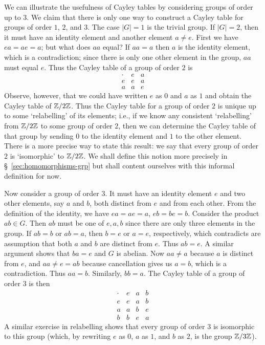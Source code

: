 \begin{example}
    We can illustrate the usefulness of Cayley tables by considering groups of
    order up to \(3\). We claim that there is only one way to construct a Cayley
    table for groups of order \(1\), \(2\), and \(3\). The case \(|G| = 1\) is
    the trivial group. If \(|G| = 2\), then it must have an identity element and
    another element \(a \neq e\). First we have \(ea = ae = a\); but what does
    \(aa\) equal? If \(aa = a\) then \(a\) is the identity element, which is a
    contradiction; since there is only one other element in the group, \(aa\)
    must equal \(e\). Thus the Cayley table of a group of order \(2\) is
    \[
        \begin{array}{c|cc}
            \cdot & e & a\\
            \hline
            e & e & a\\
            a & a & e
        \end{array}
    \]
    Observe, however, that we could have written \(e\) as \(0\) and \(a\) as
    \(1\) and obtain the Cayley table of \(\mathbb{Z}/2\mathbb{Z}\). Thus the Cayley table for a
    group of order \(2\) is unique up to some `relabelling' of its elements;
    i.e., if we know any consistent `relabelling' from \(\mathbb{Z}/2\mathbb{Z}\) to some group
    of order \(2\), then we can determine the Cayley table of that group by
    sending \(0\) to the identity element and \(1\) to the other element. There
    is a more precise way to state this result: we say that every group of order
    \(2\) is `isomorphic' to \(\mathbb{Z}/2\mathbb{Z}\). We shall define this notion more
    precisely in \S~\ref{sec:homomorphisms-grp} but shall content ourselves with
    this informal definition for now.

    Now consider a group of order \(3\). It must have an identity element \(e\)
    and two other elements, say \(a\) and \(b\), both distinct from \(e\) and
    from each other. From the definition of the identity, we have \(ea = ae =
    a\), \(eb = be = b\). Consider the product \(ab \in G\). Then \(ab\) must be
    one of \(e, a, b\) since there are only three elements in the group. If \(ab
    = b\) or \(ab = a\), then \(b = e\) or \(a = e\), respectively, which
    contradicts are assumption that both \(a\) and \(b\) are distinct from
    \(e\). Thus \(ab = e\). A similar argument shows that \(ba = e\) and \(G\)
    is abelian. Now \(aa \neq a\) because \(a\) is distinct from \(e\), and \(aa
    \neq e = ab\) because cancellation gives us \(a = b\), which is a
    contradiction. Thus \(aa = b\). Similarly, \(bb = a\). The Cayley table of a
    group of order \(3\) is then
    \[
        \begin{array}{c|ccc}
            \cdot & e & a & b\\
            \hline
            e & e & a & b\\
            a & a & b & e\\
            b & b & e & a
        \end{array}
    \]
    A similar exercise in relabelling shows that every group of order \(3\) is
    isomorphic to this group (which, by rewriting \(e\) as \(0\), \(a\) as
    \(1\), and \(b\) as \(2\), is the group \(\mathbb{Z}/3\mathbb{Z}\)).
\end{example}

